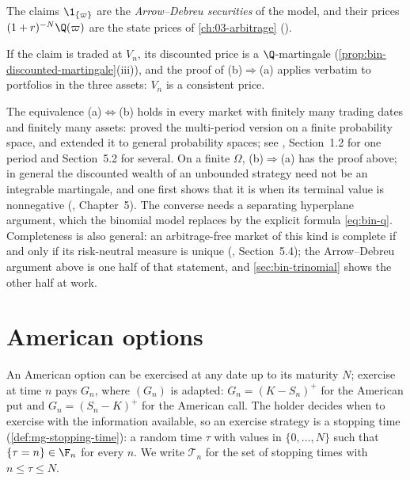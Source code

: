 The claims $\1_{\{\varpi\}}$ are the \emph{Arrow--Debreu securities} of the model, and
their prices $(1+r)^{-N}\Q(\varpi)$ are the state prices of \cref{ch:03-arbitrage}
().

\begin{remark}\label{rem:bin-extended}
If the claim is traded at $V_n$, its discounted price is a $\Q$-martingale
(\cref{prop:bin-discounted-martingale}(iii)), and the proof of (b)$\Rightarrow$(a) applies
verbatim to portfolios in the three assets: $V_n$ is a consistent price.
\end{remark}

\begin{remark}\label{rem:bin-ftap-general}
The equivalence (a)$\Leftrightarrow$(b) holds in every market with finitely many trading
dates and finitely many assets: \textcite{harrison-pliska} proved the multi-period version
on a finite probability space, and \textcite{dalang-morton-willinger} extended it to general
probability spaces; see \textcite{follmer-schied}, Section~1.2 for one period and
Section~5.2 for several. On a finite $\Omega$, (b)$\Rightarrow$(a) has the proof above; in
general the discounted wealth of an unbounded strategy need not be an integrable
martingale, and one first shows that it is when its terminal value is nonnegative
(\textcite{follmer-schied}, Chapter~5). The converse needs a separating hyperplane
argument, which the binomial model replaces by the explicit formula \eqref{eq:bin-q}. Completeness is also general: an
arbitrage-free market of this kind is complete if and only if its risk-neutral measure is
unique (\textcite{follmer-schied}, Section~5.4); the Arrow--Debreu argument above is one
half of that statement, and \cref{sec:bin-trinomial} shows the other half at work.
\end{remark}

\section{American options}\label{sec:bin-american}

An American option can be exercised at any date up to its maturity $N$; exercise at time
$n$ pays $G_n$, where $(G_n)$ is adapted: $G_n=(K-S_n)^+$ for the American put and
$G_n=(S_n-K)^+$ for the American call. The holder decides when to exercise with the
information available, so an exercise strategy is a stopping time
(\cref{def:mg-stopping-time}): a random time $\tau$ with values in $\{0,\dots,N\}$ such
that $\{\tau=n\}\in\F_n$ for every $n$. We write $\mathcal T_n$ for
the set of stopping times with $n\le\tau\le N$.

